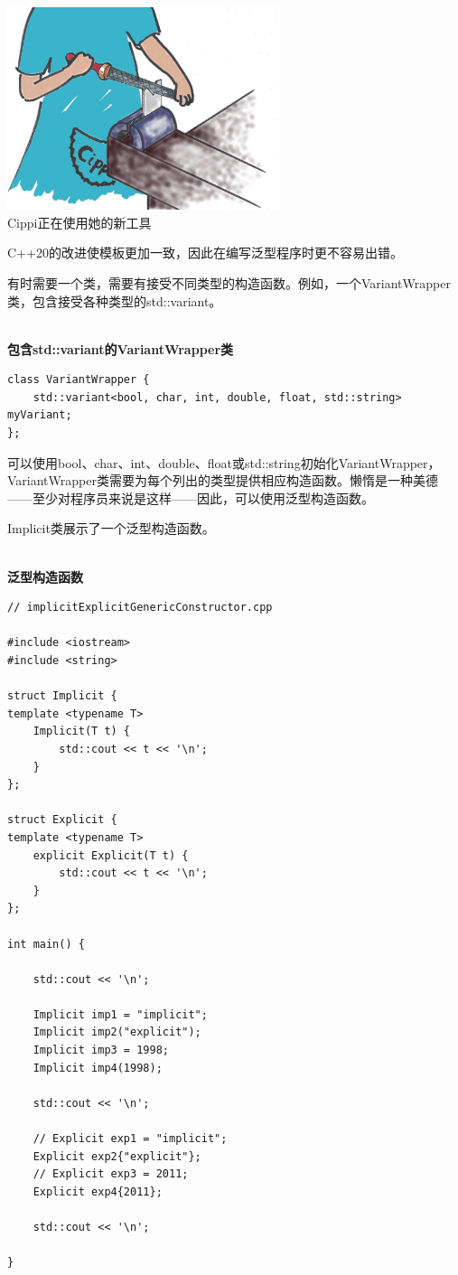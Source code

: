 \begin{center}
\includegraphics[width=0.6\textwidth]{content/3/chapter4/images/40.png}\\
Cippi正在使用她的新工具
\end{center}

C++20的改进使模板更加一致，因此在编写泛型程序时更不容易出错。


有时需要一个类，需要有接受不同类型的构造函数。例如，一个VariantWrapper类，包含接受各种类型的std::variant。

\hspace*{\fill} \\ %
\noindent
\textbf{包含std::variant的VariantWrapper类}
\begin{lstlisting}[style=styleCXX]
class VariantWrapper {
	std::variant<bool, char, int, double, float, std::string> myVariant;
};
\end{lstlisting}

可以使用bool、char、int、double、float或std::string初始化VariantWrapper，VariantWrapper类需要为每个列出的类型提供相应构造函数。懒惰是一种美德——至少对程序员来说是这样——因此，可以使用泛型构造函数。

Implicit类展示了一个泛型构造函数。

\hspace*{\fill} \\ %
\noindent
\textbf{泛型构造函数}
\begin{lstlisting}[style=styleCXX]
// implicitExplicitGenericConstructor.cpp

#include <iostream>
#include <string>

struct Implicit {
template <typename T>
	Implicit(T t) {
		std::cout << t << '\n';
	}
};

struct Explicit {
template <typename T>
	explicit Explicit(T t) {
		std::cout << t << '\n';
	}
};

int main() {
	
	std::cout << '\n';
	
	Implicit imp1 = "implicit";
	Implicit imp2("explicit");
	Implicit imp3 = 1998;
	Implicit imp4(1998);
	
	std::cout << '\n';
	
	// Explicit exp1 = "implicit";
	Explicit exp2{"explicit"};
	// Explicit exp3 = 2011;
	Explicit exp4{2011};
	
	std::cout << '\n';

}
\end{lstlisting}

